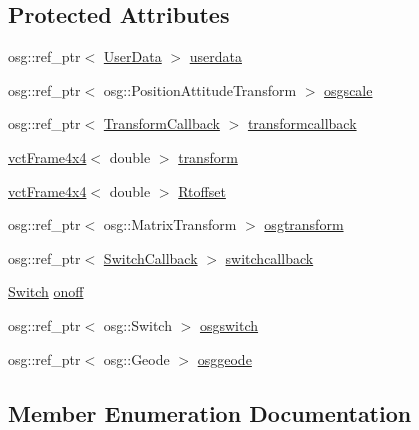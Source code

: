 \subsection*{Protected Attributes}
\begin{DoxyCompactItemize}
\item 
osg\+::ref\+\_\+ptr$<$ \hyperlink{classosa_o_s_g_body_1_1_user_data}{User\+Data} $>$ \hyperlink{classosa_o_s_g_body_aaaa048aa92048243a7bf355e6d178ec1}{userdata}
\item 
osg\+::ref\+\_\+ptr$<$ osg\+::\+Position\+Attitude\+Transform $>$ \hyperlink{classosa_o_s_g_body_ac68655b29f93f536143816956b5e1c5d}{osgscale}
\item 
osg\+::ref\+\_\+ptr$<$ \hyperlink{classosa_o_s_g_body_1_1_transform_callback}{Transform\+Callback} $>$ \hyperlink{classosa_o_s_g_body_a8d4d3d23660fa1fbd6cdfec7e2541a14}{transformcallback}
\item 
\hyperlink{classvct_frame4x4}{vct\+Frame4x4}$<$ double $>$ \hyperlink{classosa_o_s_g_body_a587be8e221a906f5c8d9676fadea5caf}{transform}
\item 
\hyperlink{classvct_frame4x4}{vct\+Frame4x4}$<$ double $>$ \hyperlink{classosa_o_s_g_body_ad008984bdb0eda300948932eda13974a}{Rtoffset}
\item 
osg\+::ref\+\_\+ptr$<$ osg\+::\+Matrix\+Transform $>$ \hyperlink{classosa_o_s_g_body_a7077ad80a1b17557f29ddda29ed0b7ec}{osgtransform}
\item 
osg\+::ref\+\_\+ptr$<$ \hyperlink{classosa_o_s_g_body_1_1_switch_callback}{Switch\+Callback} $>$ \hyperlink{classosa_o_s_g_body_a5f183b1bed32990d46bfa30bc466391b}{switchcallback}
\item 
\hyperlink{classosa_o_s_g_body_a1820a6192991316ef8fdeb216538c370}{Switch} \hyperlink{classosa_o_s_g_body_a2f491c9c85f3e0d097f342af4e20b9ea}{onoff}
\item 
osg\+::ref\+\_\+ptr$<$ osg\+::\+Switch $>$ \hyperlink{classosa_o_s_g_body_ad40360f7384568a29bdceaee80d0ca23}{osgswitch}
\item 
osg\+::ref\+\_\+ptr$<$ osg\+::\+Geode $>$ \hyperlink{classosa_o_s_g_body_a581c0cb7bfb2f67fa0c95888b1421859}{osggeode}
\end{DoxyCompactItemize}


\subsection{Member Enumeration Documentation}
\hypertarget{classosa_o_s_g_body_a1820a6192991316ef8fdeb216538c370}{}
